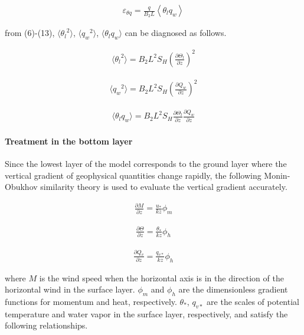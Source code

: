 \begin{eqnarray}
\varepsilon_{\theta q}=\frac{q}{B_{2} L}\left\langle\theta_{l} q_{w}\right\rangle \label{13}
\end{eqnarray}

from (6)-(13), \(\langle {\theta_l}^2 \rangle\),
\(\langle {q_w}^2 \rangle\), \(\langle \theta_l q_w \rangle\) can be
diagnosed as follows.

\begin{eqnarray}\langle {\theta_l}^2 \rangle =B_2L^2S_H\left(\frac{\partial \Theta_l}{\partial z}\right)^2\end{eqnarray}

\begin{eqnarray}\langle {q_w}^2 \rangle =B_2L^2S_H\left(\frac{\partial Q_w}{\partial z}\right)^2\end{eqnarray}

\begin{eqnarray}\langle \theta_l q_w \rangle =B_2L^2S_H\frac{\partial \Theta_l}{\partial z}\frac{\partial Q_w}{\partial z}\end{eqnarray}

\hypertarget{treatment-in-the-bottom-layer}{%
\paragraph{Treatment in the bottom
layer}\label{treatment-in-the-bottom-layer}}

Since the lowest layer of the model corresponds to the ground layer
where the vertical gradient of geophysical quantities change rapidly,
the following Monin-Obukhov similarity theory is used to evaluate the
vertical gradient accurately.

\begin{eqnarray} \frac{\partial M}{\partial z} = \frac{u_*}{kz}\phi_m \label{14}\end{eqnarray}

\begin{eqnarray} \frac{\partial \Theta}{\partial z} = \frac{\theta_*}{kz}\phi_h \label{15}\end{eqnarray}

\begin{eqnarray} \frac{\partial Q_v}{\partial z} = \frac{q_{v*}}{kz}\phi_h \label{16}\end{eqnarray}

where \(M\) is the wind speed when the horizontal axis is in the
direction of the horizontal wind in the surface layer. \(\phi_m\) and
\(\phi_h\) are the dimensionless gradient functions for momentum and
heat, respectively. \(\theta_*\), \(q_{v*}\) are the scales of potential
temperature and water vapor in the surface layer, respectively, and
satisfy the following relationships.

